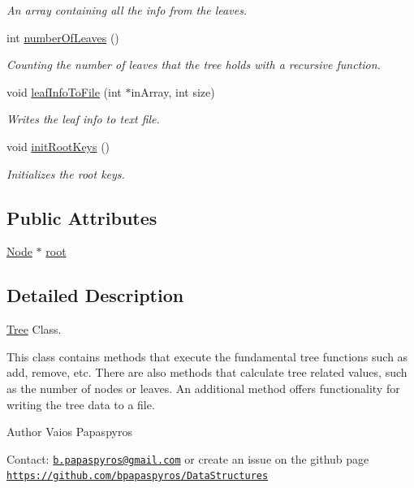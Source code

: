 \begin{DoxyCompactItemize}
\begin{DoxyCompactList}\small\item\em An array containing all the info from the leaves. \end{DoxyCompactList}\item 
int \hyperlink{class_tree_a54ddf4e99c00553a6b07cb9b149988e2}{number\-Of\-Leaves} ()
\begin{DoxyCompactList}\small\item\em Counting the number of leaves that the tree holds with a recursive function. \end{DoxyCompactList}\item 
void \hyperlink{class_tree_a8a64e556c6fc5da582739c3c80d65600}{leaf\-Info\-To\-File} (int $\ast$in\-Array, int size)
\begin{DoxyCompactList}\small\item\em Writes the leaf info to text file. \end{DoxyCompactList}\item 
void \hyperlink{class_tree_ad1a1d70cd502cbdc0635a0921199fcfb}{init\-Root\-Keys} ()
\begin{DoxyCompactList}\small\item\em Initializes the root keys. \end{DoxyCompactList}\end{DoxyCompactItemize}
\subsection*{Public Attributes}
\begin{DoxyCompactItemize}
\item 
\hyperlink{class_node}{Node} $\ast$ \hyperlink{class_tree_ad8e46ce0aead5778cbdd784d1e370d5f}{root}
\end{DoxyCompactItemize}


\subsection{Detailed Description}
\hyperlink{class_tree}{Tree} Class. 

This class contains methods that execute the fundamental tree functions such as add, remove, etc. There are also methods that calculate tree related values, such as the number of nodes or leaves. An additional method offers functionality for writing the tree data to a file.

\begin{DoxyAuthor}{Author}
Vaios Papaspyros
\end{DoxyAuthor}
Contact\-: \href{mailto:b.papaspyros@gmail.com}{\tt b.\-papaspyros@gmail.\-com} or create an issue on the github page \href{https://github.com/bpapaspyros/DataStructures}{\tt https\-://github.\-com/bpapaspyros/\-Data\-Structures} 

